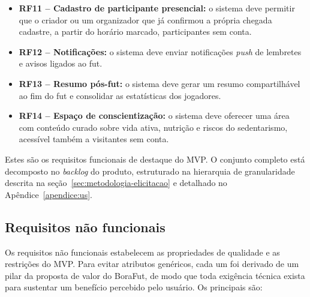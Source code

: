 \begin{itemize}
          \item \textbf{RF11 – Cadastro de participante presencial:} o sistema deve permitir que o criador ou um organizador que já confirmou a própria chegada cadastre, a partir do horário marcado, participantes sem conta.

          \item \textbf{RF12 – Notificações:} o sistema deve enviar notificações \textit{push} de lembretes e avisos ligados ao fut.

          \item \textbf{RF13 – Resumo pós-fut:} o sistema deve gerar um resumo compartilhável ao fim do fut e consolidar as estatísticas dos jogadores.

          \item \textbf{RF14 – Espaço de conscientização:} o sistema deve oferecer uma área com conteúdo curado sobre vida ativa, nutrição e riscos do sedentarismo, acessível também a visitantes sem conta.
      \end{itemize}

      Estes são os requisitos funcionais de destaque do MVP. O conjunto completo está decomposto no \textit{backlog} do produto, estruturado na hierarquia de granularidade descrita na seção~\ref{sec:metodologia-elicitacao} e detalhado no Apêndice~\ref{apendice:us}.

    \subsection{Requisitos não funcionais}
      \label{subsec:rnf}
      Os requisitos não funcionais estabelecem as propriedades de qualidade e as restrições do MVP. Para evitar atributos genéricos, cada um foi derivado de um pilar da proposta de valor do BoraFut, de modo que toda exigência técnica exista para sustentar um benefício percebido pelo usuário. Os principais são:

